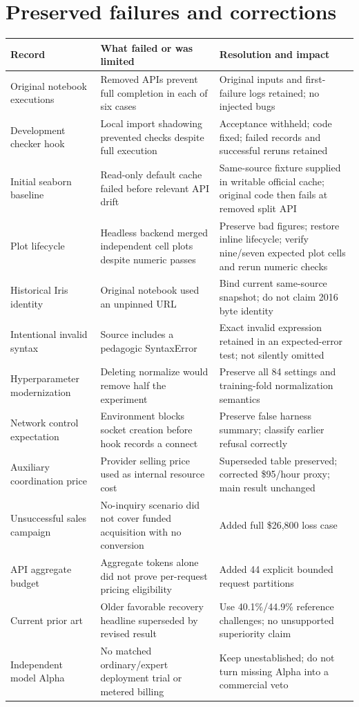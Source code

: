 \section{Preserved failures and corrections}
\begin{longtable}{@{}p{.23\linewidth}p{.36\linewidth}p{.34\linewidth}@{}}
\toprule
Record & What failed or was limited & Resolution and impact\\\midrule
\endhead
Original notebook executions & Removed APIs prevent full completion in each of six cases & Original inputs and first-failure logs retained; no injected bugs\\
Development checker hook & Local import shadowing prevented checks despite full execution & Acceptance withheld; code fixed; failed records and successful reruns retained\\
Initial seaborn baseline & Read-only default cache failed before relevant API drift & Same-source fixture supplied in writable official cache; original code then fails at removed split API\\
Plot lifecycle & Headless backend merged independent cell plots despite numeric passes & Preserve bad figures; restore inline lifecycle; verify nine/seven expected plot cells and rerun numeric checks\\
Historical Iris identity & Original notebook used an unpinned URL & Bind current same-source snapshot; do not claim 2016 byte identity\\
Intentional invalid syntax & Source includes a pedagogic SyntaxError & Exact invalid expression retained in an expected-error test; not silently omitted\\
Hyperparameter modernization & Deleting normalize would remove half the experiment & Preserve all 84 settings and training-fold normalization semantics\\
Network control expectation & Environment blocks socket creation before hook records a connect & Preserve false harness summary; classify earlier refusal correctly\\
Auxiliary coordination price & Provider selling price used as internal resource cost & Superseded table preserved; corrected \$95/hour proxy; main result unchanged\\
Unsuccessful sales campaign & No-inquiry scenario did not cover funded acquisition with no conversion & Added full \$26,800 loss case\\
API aggregate budget & Aggregate tokens alone did not prove per-request pricing eligibility & Added 44 explicit bounded request partitions\\
Current prior art & Older favorable recovery headline superseded by revised result & Use 40.1\%/44.9\% reference challenges; no unsupported superiority claim\\
Independent model Alpha & No matched ordinary/expert deployment trial or metered billing & Keep unestablished; do not turn missing Alpha into a commercial veto\\\bottomrule
\end{longtable}

